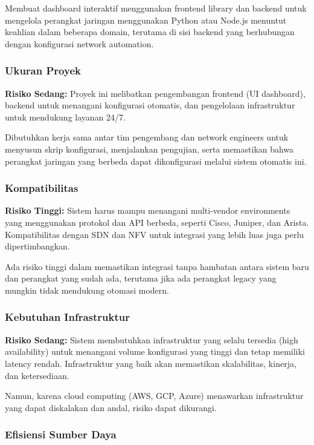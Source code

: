 Membuat dashboard interaktif menggunakan frontend library dan backend untuk mengelola perangkat jaringan menggunakan Python atau Node.js menuntut keahlian dalam beberapa domain, terutama di sisi backend yang berhubungan dengan konfigurasi network automation.

\subsubsection{Ukuran Proyek}

\textbf{Risiko Sedang:} Proyek ini melibatkan pengembangan frontend (UI dashboard), backend untuk menangani konfigurasi otomatis, dan pengelolaan infrastruktur untuk mendukung layanan 24/7.

Dibutuhkan kerja sama antar tim pengembang dan network engineers untuk menyusun skrip konfigurasi, menjalankan pengujian, serta memastikan bahwa perangkat jaringan yang berbeda dapat dikonfigurasi melalui sistem otomatis ini.

\subsubsection{Kompatibilitas}

\textbf{Risiko Tinggi:} Sistem harus mampu menangani multi-vendor environments yang menggunakan protokol dan API berbeda, seperti Cisco, Juniper, dan Arista. Kompatibilitas dengan SDN dan NFV untuk integrasi yang lebih luas juga perlu dipertimbangkan.

Ada risiko tinggi dalam memastikan integrasi tanpa hambatan antara sistem baru dan perangkat yang sudah ada, terutama jika ada perangkat legacy yang mungkin tidak mendukung otomasi modern.

\subsubsection{Kebutuhan Infrastruktur}

\textbf{Risiko Sedang:} Sistem membutuhkan infrastruktur yang selalu tersedia (high availability) untuk menangani volume konfigurasi yang tinggi dan tetap memiliki latency rendah. Infrastruktur yang baik akan memastikan skalabilitas, kinerja, dan ketersediaan.

Namun, karena cloud computing (AWS, GCP, Azure) menawarkan infrastruktur yang dapat diskalakan dan andal, risiko dapat dikurangi.

\subsubsection{Efisiensi Sumber Daya}

